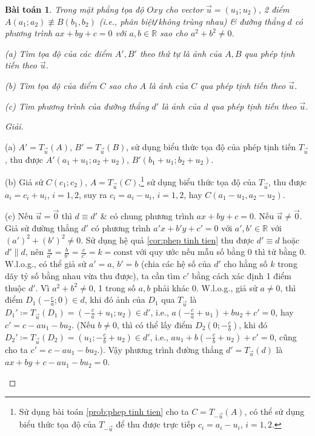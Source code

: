 \documentclass[oneside]{book}
\numberwithin{equation}{section}
\newtheorem{baitoan}{Bài toán}[section]
\begin{document}
\begin{baitoan}
	Trong mặt phẳng tọa độ $Oxy$ cho vector $\vec{u} = (u_1;u_2)$, 2 điểm $A(a_1;a_2)\not\equiv B(b_1,b_2)$ (i.e., phân biệt\emph{\texttt{/}}không trùng nhau) \& đường thẳng $d$ có phương trình $ax + by + c = 0$ với $a,b\in\mathbb{R}$ sao cho $a^2 + b^2\ne 0$.
	\begin{enumerate*}
		\item[(a)] Tìm tọa độ của các điểm $A',B'$ theo thứ tự là ảnh của $A,B$ qua phép tịnh tiến theo $\vec{u}$.
		\item[(b)] Tìm tọa độ của điểm $C$ sao cho $A$ là ảnh của $C$ qua phép tịnh tiến theo $\vec{u}$.
		\item[(c)] Tìm phương trình của đường thẳng $d'$  là ảnh của $d$ qua phép tịnh tiến theo $\vec{u}$.
	\end{enumerate*}
\end{baitoan}

\begin{proof}[Giải]
	\begin{enumerate*}
		\item[(a)] $A' = T_{\vec{u}}(A)$, $B' = T_{\vec{u}}(B)$, sử dụng biểu thức tọa độ của phép tịnh tiến $T_{\vec{u}}$, thu được $A'(a_1 + u_1;a_2 + u_2)$, $B'(b_1 + u_1;b_2 + u_2)$.
		\item[(b)] Giả sử $C(c_1;c_2)$, $A = T_{\vec{u}}(C)$,\footnote{Sử dụng bài toán \ref{prob:phep tinh tien} cho ta $C = T_{-\vec{u}}(A)$, có thể sử dụng biểu thức tọa độ của $T_{-\vec{u}}$ để thu được trực tiếp $c_i = a_i - u_i$, $i = 1,2$.} sử dụng biểu thức tọa độ của $T_{\vec{u}}$, thu được $a_i = c_i + u_i$, $i = 1,2$, suy ra $c_i = a_i - u_i$, $i = 1,2$, hay $C(a_1 - u_1,a_2 - u_2)$.
		\item[(c)] Nếu $\vec{u} = \vec{0}$ thì $d\equiv d'$ \& có chung phương trình $ax + by + c = 0$. Nếu $\vec{u}\ne\vec{0}$. Giả sử đường thẳng $d'$ có phương trình $a'x + b'y + c' = 0$ với $a',b'\in\mathbb{R}$ với $(a')^2 + (b')^2\ne 0$. Sử dụng hệ quả \ref{cor:phep tinh tien} thu được $d'\equiv d$ hoặc $d'\parallel d$, nên $\frac{a}{a'} = \frac{b}{b'} = \frac{c}{c'} = k = \mbox{const}$ với quy ước nếu mẫu số bằng $0$ thì tử bằng $0$. W.l.o.g., có thể giả sử $a' = a$, $b' = b$ (chia các hệ số của $d'$ cho hằng số $k$ trong dãy tỷ số bằng nhau vừa thu được), ta cần tìm $c'$ bằng cách xác định 1 điểm thuộc $d'$. Vì $a^2 + b^2\ne 0$, 1 trong số $a,b$ phải khác $0$. W.l.o.g., giả sử $a\ne 0$, thì điểm $D_1\left(-\frac{c}{a};0\right)\in d$, khi đó ảnh của $D_1$ qua $T_{\vec{u}}$ là $D_1'\coloneqq T_{\vec{u}}(D_1) = \left(-\frac{c}{a} + u_1;u_2\right)\in d'$, i.e., $a\left(-\frac{c}{a} + u_1\right) + bu_2 + c' = 0$, hay $c' = c - au_1 - bu_2$. (Nếu $b\ne 0$, thì có thể lấy điểm $D_2\left(0;-\frac{c}{b}\right)$, khi đó $D_2'\coloneqq T_{\vec{u}}(D_2) = \left(u_1;-\frac{c}{b} + u_2\right)\in d'$, i.e., $au_1 + b\left(-\frac{c}{b} + u_2\right) + c' = 0$, cũng cho ta $c' = c - au_1 - bu_2$.). Vậy phương trình đường thẳng $d' = T_{\vec{u}}(d)$ là $ax + by + c - au_1 - bu_2 = 0$.
	\end{enumerate*}
\end{proof}
\end{document}
